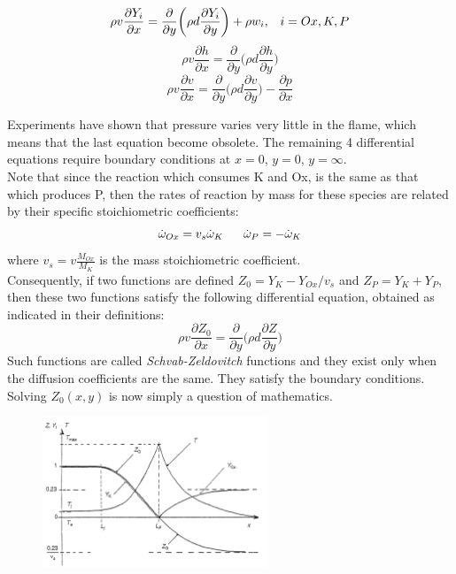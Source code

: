 \documentclass[12pt]{article}
\begin{document}
\begin{equation}
    \rho v\frac{\partial Y_{i}}{\partial x}=\frac{\partial}{\partial y}\bigg(\rho d \frac{\partial Y_{i}}{\partial y} \bigg) + \rho w_{i}, \text{\;}\text{\;}\text{\;} i=Ox, K, P
\end{equation}
\begin{equation}
    \rho v\frac{\partial h}{\partial x}=\frac{\partial}{\partial y}\bigg(\rho d \frac{\partial h}{\partial y} \bigg)
\end{equation}
\begin{equation}
    \rho v\frac{\partial v}{\partial x}=\frac{\partial}{\partial y}\bigg(\rho d \frac{\partial v}{\partial y} \bigg) - \frac{\partial p}{\partial x}
\end{equation}

Experiments have shown that pressure varies very little in the flame, which means that the last equation become obsolete. The remaining 4 differential equations require boundary conditions at $x=0$, $y=0$, $y=\infty$.\\
Note that since the reaction which consumes K and Ox, is the same as that which produces P, then the rates of reaction by mass for these species are related by their specific stoichiometric coefficients:
\begin{equation}
    \dot{\omega}_{Ox} = v_{s}\dot{\omega}_{K} \text{\;\;\;\;\;\;} \dot{\omega}_{P} = -\dot{\omega}_{K}
\end{equation}
where $v_{s}=v\frac{M_{Ox}}{M_{K}}$ is the mass stoichiometric coefficient.\\
Consequently, if two functions are defined $Z_{0}=Y_{K}-Y_{Ox}/v_{s}$ and $Z_{P} = Y_{K}+Y_{P}$, then these two functions satisfy the following differential equation, obtained as indicated in their definitions:
\begin{equation}
    \rho v\frac{\partial Z_{0}}{\partial x}=\frac{\partial}{\partial y}\bigg(\rho d \frac{\partial Z}{\partial y} \bigg)
\end{equation}
Such functions are called \textit{Schvab-Zeldovitch} functions and they exist only when the diffusion coefficients are the same. They satisfy the boundary conditions. Solving $Z_{0}(x,y)$ is now simply a question of mathematics.

\begin{figure}[h!]
\centering
\includegraphics[width=0.6\textwidth]{figures/schumann.png}
\end{figure}
\end{document}
